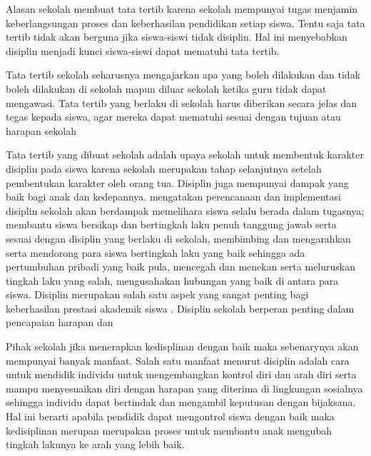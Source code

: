 \documentclass[f4paper,12pt, left=3cm,right=2cm,bottom=2cm, bahasa]{article}
\begin{document}
Alasan sekolah membuat tata tertib karena sekolah mempunyai tugas 
menjamin keberlangsungan proses dan keberhasilan pendidikan setiap siswa. 
Tentu saja tata tertib tidak akan berguna jika siswa-siswi tidak disiplin. Hal ini 
menyebabkan disiplin menjadi kunci siswa-siswi dapat mematuhi tata tertib. 

Tata tertib sekolah seharusnya mengajarkan apa yang boleh dilakukan dan tidak \cite{Widi_et_al_2018}
boleh dilakukan di sekolah mapun diluar sekolah ketika guru tidak dapat 
mengawasi. Tata tertib yang berlaku di sekolah harus diberikan secara jelas dan 
tegas kepada siswa, agar mereka dapat mematuhi sesuai dengan tujuan atau 
harapan sekolah

Tata tertib yang dibuat sekolah adalah upaya sekolah untuk membentuk 
karakter disiplin pada siswa karena sekolah merupakan tahap selanjutnya 
setelah pembentukan karakter oleh orang tua. Disiplin juga mempunyai dampak 
yang baik bagi anak dan kedepannya.\cite{tu2004peran} mengatakan perencanaan dan  implementasi
disiplin sekolah akan berdampak memelihara siswa selalu berada dalam tugasnya; membantu siswa bersikap dan bertingkah laku penuh tanggung jawab serta sesuai dengan disiplin yang berlaku di sekolah, membimbing dan mengarahkan serta mendorong para siswa bertingkah laku yang baik sehingga ada pertumbuhan pribadi yang baik pula, mencegah dan menekan serta meluruskan tingkah laku yang salah, mengusahakan hubungan yang baik di antara para siswa. 
Disiplin merupakan salah satu aspek yang sangat penting bagi keberhasilan prestasi 
akademik siswa . Disiplin sekolah berperan penting dalam pencapaian harapan dan 

Pihak sekolah jika menerapkan kedisplinan dengan baik maka sebenarynya akan mempunyai banyak manfaat. Salah satu manfaat menurut  \cite{Hurlock_1991} disiplin adalah cara untuk mendidik individu untuk mengembangkan kontrol diri dan arah diri serta mampu menyesuaikan diri dengan harapan yang diterima di lingkungan sosialnya sehingga individu dapat bertindak dan mengambil keputusan dengan bijaksana. Hal ini berarti apabila pendidik dapat mengontrol siswa dengan baik maka kedisiplinan merupan merupakan proses untuk membantu anak mengubah tingkah lakunya ke arah yang lebih baik. \cite{njoroge_2014}
\end{document}
